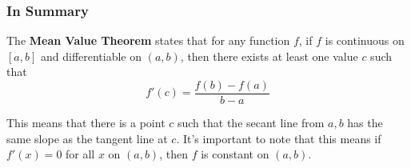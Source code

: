 \documentclass{ximera}
\begin{document}
\subsubsection{In Summary}
\begin{definition}
The \textbf{Mean Value Theorem} states that for any function $f$, if $f$ is continuous on $[a,b]$ and differentiable on $(a,b)$, then there exists at least one value $c$ such that $$f'(c)=\frac{f(b)-f(a)}{b-a}$$

This means that there is a point $c$ such that the secant line from $a, b$ has the same slope as the tangent line at $c$. It's important to note that this means if $f'(x)=0$ for all $x$ on $(a,b)$, then $f$ is constant on $(a,b)$.
\end{definition}
\end{document}
